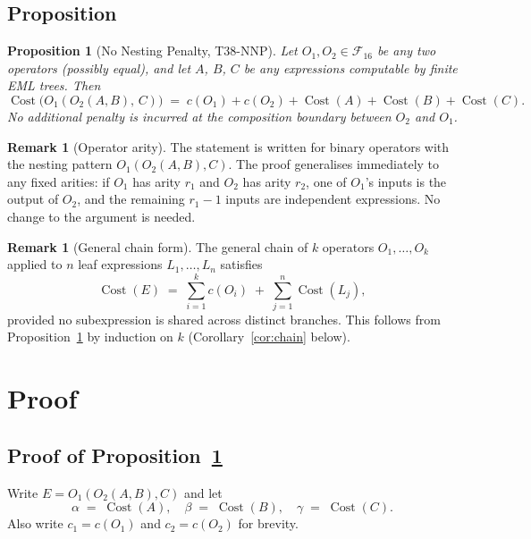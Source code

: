 \documentclass[12pt,a4paper]{article}
\newtheorem{proposition}[theorem]{Proposition}
\theoremstyle{definition}
\newtheorem{remark}[theorem]{Remark}
\newcommand{\Cost}{\operatorname{Cost}}
\newcommand{\uc}[1]{c(#1)}   %
\begin{document}
\subsection{Proposition}

\begin{proposition}[No Nesting Penalty, T38-NNP]
\label{prop:NNP}
Let $O_1, O_2 \in \mathcal{F}_{16}$ be any two operators (possibly equal),
and let $A$, $B$, $C$ be any expressions computable by finite EML trees.
Then
\[
  \boxed{
    \Cost\!\bigl(O_1(O_2(A,B),\, C)\bigr)
    \;=\;
    \uc{O_1} + \uc{O_2} + \Cost(A) + \Cost(B) + \Cost(C).
  }
\]
No additional penalty is incurred at the composition boundary between
$O_2$ and $O_1$.
\end{proposition}

\begin{remark}[Operator arity]
The statement is written for binary operators with the nesting pattern
$O_1(O_2(A,B), C)$.  The proof generalises immediately to any fixed
arities: if $O_1$ has arity $r_1$ and $O_2$ has arity $r_2$, one of
$O_1$'s inputs is the output of $O_2$, and the remaining $r_1 - 1$ inputs
are independent expressions.  No change to the argument is needed.
\end{remark}

\begin{remark}[General chain form]
The general chain of $k$ operators $O_1, \ldots, O_k$ applied to $n$
leaf expressions $L_1, \ldots, L_n$ satisfies
\[
  \Cost(E) \;=\; \sum_{i=1}^{k} \uc{O_i} \;+\; \sum_{j=1}^{n} \Cost(L_j),
\]
provided no subexpression is shared across distinct branches.
This follows from Proposition~\ref{prop:NNP} by induction on $k$
(Corollary~\ref{cor:chain} below).
\end{remark}

\section{Proof}
\label{sec:proof}

\subsection{Proof of Proposition~\ref{prop:NNP}}

Write $E = O_1(O_2(A,B), C)$ and let
\[
  \alpha \;=\; \Cost(A), \quad
  \beta  \;=\; \Cost(B), \quad
  \gamma \;=\; \Cost(C).
\]
Also write $c_1 = \uc{O_1}$ and $c_2 = \uc{O_2}$ for brevity.
\end{document}
